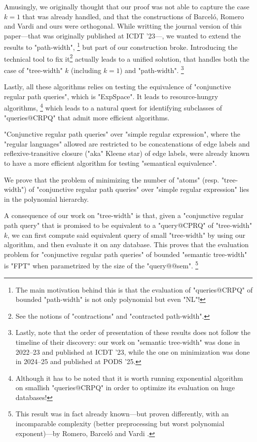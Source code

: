 Amusingly, we originally thought that our proof was not able to
capture the case $k=1$ that was already handled, and that the constructions
of Barceló, Romero and Vardi and ours were orthogonal.
While writting the journal version of this paper---that was originally
published at ICDT '23---, we wanted to extend the results to "path-width",%
\footnote{The main motivation behind this is that the evaluation of "queries@CRPQ"
of bounded "path-width" is not only polynomial but even "NL"!}
but part of our construction broke. Introducing the technical tool
to fix it\footnote{See the notions of "contractions" and "contracted path-width".}
actually leads to a unified solution, that handles both
the case of "tree-width" $k$ (including $k=1$) and "path-width".%
\footnote{Lastly, note that the order of presentation of these results
does not follow the timeline of their discovery: our work on "semantic tree-width"
was done in 2022--23 and published at ICDT '23, while the one on minimization
was done in 2024--25 and published at PODS '25.}

Lastly, all these algorithms relies on testing the equivalence
of "conjunctive regular path queries", which is "ExpSpace".
It leads to resource-hungry algorithms,%
\footnote{Although it has to be noted that it is worth running exponential
algorithm on smallish "queries@CRPQ" in order to optimize
its evaluation on huge databases!}
which leads to a natural quest for identifying subclasses
of "queries@CRPQ" that admit more efficient algorithms.

"Conjunctive regular path queries" over "simple regular expression",
where the "regular languages" allowed are restricted to be concatenations of
edge labels and reflexive-transitive closure ("aka" Kleene star) of
edge labels, were already known to have a more efficient
algorithm for testing "semantical equivalence".

\begin{contribution}
	We prove that the problem of minimizing the number of "atoms" (resp. "tree-width")
	of "conjunctive regular path queries" over "simple regular expression"
	lies in the polynomial hierarchy.
\end{contribution}

A consequence of our work on "tree-width" is that,
given a "conjunctive regular path query" that is promised to be equivalent
to a "query@CPRQ" of "tree-width" $k$, we can first compute said
equivalent query of small "tree-width" by using our algorithm,
and then evaluate it on any database. This proves that the evaluation
problem for "conjunctive regular path queries" of bounded "semantic tree-width"
is "FPT" when parametrized by the size of the "query@@sem".%
\footnote[-6em]{This result was in fact already known---but proven differently, with
an incomparable complexity (better preprocessing but worst polynomial exponent)---by
Romero, Barceló and Vardi \cite{RomeroBarceloVardi2017Homomorphism}.}

